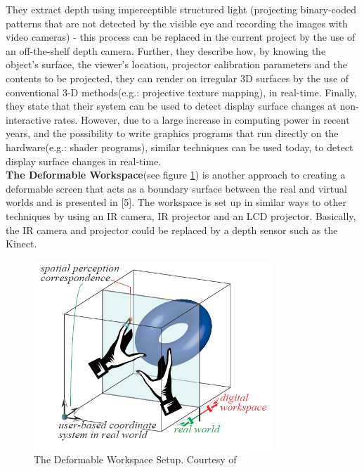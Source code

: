 \documentclass[]{article}
\begin{document}
They extract depth using imperceptible structured light (projecting binary-coded patterns that are not detected by the visible eye and recording the images with video cameras) - this process can be replaced in the current project by the use of an off-the-shelf depth camera. Further, they describe how, by knowing the object's surface, the viewer's location, projector calibration parameters and the contents to be projected, they can render on irregular 3D surfaces by the use of conventional 3-D methods(e.g.: projective texture mapping), in real-time. Finally, they state that their system can be used to detect display surface changes at non-interactive rates. However, due to a large increase in computing power in recent years, and the possibility to write graphics programs that run directly on the hardware(e.g.: shader programs), similar techniques can be used today, to detect display surface changes in real-time.\\

\textbf{The Deformable Workspace}(see figure \ref{fig:deformable_workspace}) is another approach to creating a deformable screen that acts as a boundary surface between the real and virtual worlds and is presented in [5]. The workspace is set up in similar ways to other techniques by using an IR camera, IR projector and an LCD projector. Basically, the IR camera and projector could be replaced by a depth sensor such as the Kinect. 

\begin{figure}[hbtp]
    \centering
    \includegraphics[width=0.8\textwidth]{figures/TheDeformableWorkspace.PNG}
    \caption{The Deformable Workspace Setup. Courtesy of \cite{watanabe08}}
    \label{fig:deformable_workspace}
\end{figure}
\end{document}

